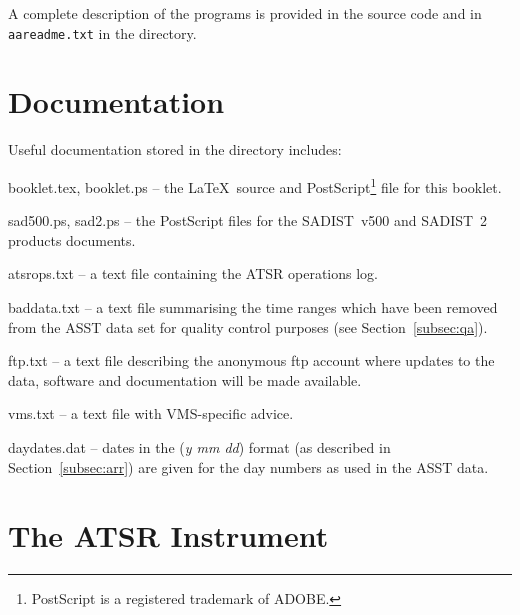 A complete description of the programs is  provided in the source code 
and in {\tt aareadme.txt} in the  directory.

\clearpage
\section{Documentation}
\label{sec:docs}
Useful documentation stored in the  directory includes:
\begin{description}
\item {booklet.tex, booklet.ps} -- the \LaTeX\ source and
PostScript\footnote{PostScript is a registered trademark of ADOBE.}
file for this booklet.

\item {sad500.ps, sad2.ps} -- the PostScript files for the 
SADIST~v500 and SADIST~2 products documents.

\item {atsrops.txt} -- a text file containing the ATSR operations log.


\item{baddata.txt}  --  a text file summarising the time ranges which
have been removed from the ASST data set for quality control purposes
(see Section~\ref{subsec:qa}).
                     
\item{ftp.txt}  --  a text file describing the anonymous ftp
account where updates to the data, software and documentation will be 
made available.

\item{vms.txt}  --  a text file with VMS-specific advice.

\item {daydates.dat} -- dates in the ({\sl y mm dd}) format (as described in 
Section~\ref{subsec:arr}) are given for the day numbers as used in the ASST 
data.
\end{description}


\clearpage
\appendix


\section{The ATSR Instrument}
\label{app:atsr}


